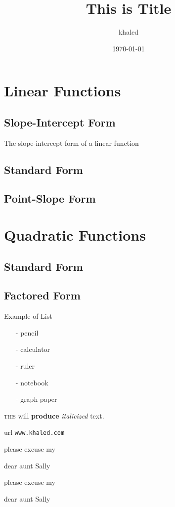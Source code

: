 \documentclass[11pt]{article}
\begin{document}
\tableofcontents

\title{This is Title}
\author{khaled}
\date{\today}
\maketitle

\section{Linear Functions}
\subsection{Slope-Intercept Form}
The slope-intercept form of a linear function
\subsection{Standard Form}
\subsection{Point-Slope Form}
\section{Quadratic Functions}
\subsection{Standard Form}
\subsection{Factored Form}

Example of List
\begin{itemize}
  \item[-] pencil
  \item[-] calculator
  \item[-] ruler
  \item[-] notebook
  \item[-] graph paper
\end{itemize}

\textsc{this} will \textbf{produce} \textit{italicized} text.

url \texttt{www.khaled.com}


please excuse my \begin{small}
  dear aunt Sally
\end{small}

please excuse my \begin{large}
  dear aunt Sally
\end{large}
\end{document}
